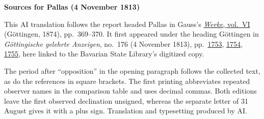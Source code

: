 \clearpage\thispagestyle{empty}
\begin{center}\textbf{Sources for Pallas (4 November 1813)}\end{center}
\noindent This AI translation follows the report headed Pallas in Gauss’s \href{https://gdz.sub.uni-goettingen.de/id/PPN236007467}{\textit{Werke}, vol.~VI} (Göttingen, 1874), pp.~369--370. It first appeared under the heading Göttingen in \textit{Göttingische gelehrte Anzeigen}, no.~176 (4 November 1813), pp.~\href{https://api.digitale-sammlungen.de/iiif/image/v2/bsb10538684_00729/full/1600,/0/default.jpg}{1753}, \href{https://api.digitale-sammlungen.de/iiif/image/v2/bsb10538684_00730/full/1600,/0/default.jpg}{1754}, \href{https://api.digitale-sammlungen.de/iiif/image/v2/bsb10538684_00731/full/1600,/0/default.jpg}{1755}, here linked to the Bavarian State Library’s digitized copy.
\par\smallskip\noindent The period after “opposition” in the opening paragraph follows the collected text, as do the references in square brackets. The first printing abbreviates repeated observer names in the comparison table and uses decimal commas. Both editions leave the first observed declination unsigned, whereas the separate letter of 31 August gives it with a plus sign. Translation and typesetting produced by AI.
\clearpage

